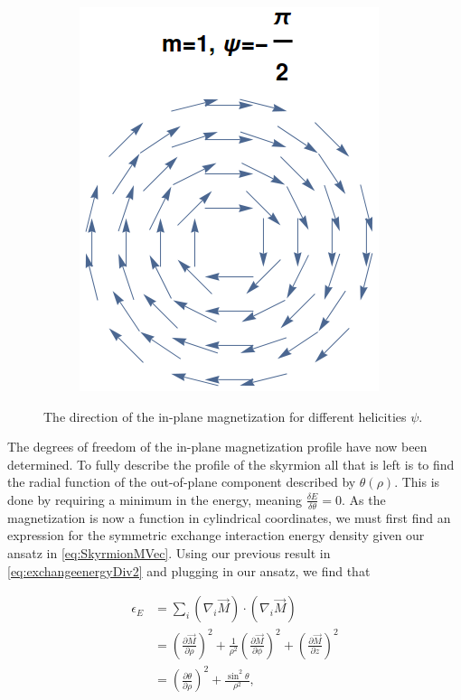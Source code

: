\documentclass[1p]{elsarticle}		%
\numberwithin{equation}{section}
\begin{document}
\begin{figure}[h!]
\begin{subfigure}{.49\textwidth}
  \caption{}
  \label{fig:m1psipi2}
\end{subfigure}
\begin{subfigure}{.49\textwidth}
  \centering
  \includegraphics[width=.6\linewidth]{Figures/m1psi-pi2.png}
  \caption{}
  \label{fig:m1psi-pi2}
\end{subfigure}
\caption{The direction of the in-plane magnetization for different helicities $\psi$. }
\label{fig:m_psi_shapes}
\end{figure}
The degrees of freedom of the in-plane magnetization profile have now been determined. To fully describe the profile of the skyrmion all that is left is to find the radial function of the out-of-plane component described by $\theta(\rho)$. This is done by requiring a minimum in the energy, meaning $\frac{\delta E}{\delta\theta} = 0$. As the magnetization is now a function in cylindrical coordinates, we must first find an expression for the symmetric exchange interaction energy density given our ansatz in \eqref{eq:SkyrmionMVec}. Using our previous result in \eqref{eq:exchangeenergyDiv2} and plugging in our ansatz, we find that

\begin{align}
\nonumber\epsilon_E &= \sum_i (\nabla_i\vec{M})\cdot(\nabla_i\vec{M}) \\
\nonumber&= (\frac{\partial \vec{M}}{\partial\rho})^2+\frac{1}{\rho^2}(\frac{\partial\vec{M}}{\partial\phi})^2+(\frac{\partial\vec{M}}{\partial z})^2\\
&= (\frac{\partial \theta}{\partial\rho})^2+\frac{\sin^2\theta}{\rho^2}, \label{eq:SymExchCylindrical}
\end{align}
\end{document}
